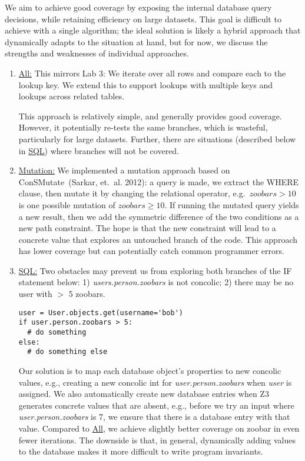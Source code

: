 \documentclass{scrartcl}
\begin{document}
We aim to achieve good coverage
by exposing the internal database query decisions, while retaining
efficiency on large datasets. This goal is difficult to achieve with a single
algorithm; the ideal solution is likely a hybrid approach that dynamically adapts to
the situation at hand, but for now, we discuss the strengths and weaknesses of
individual approaches.

\begin{enumerate}
\item \underline{All:}
  This mirrors Lab 3: We iterate over all rows and compare each to the lookup
  key.
  We extend this 
  to support lookups with multiple keys and lookups across
  related tables.

  This approach is relatively simple, and generally provides good
  coverage. However, it potentially re-tests the same branches,
  which is wasteful, particularly for large datasets. Further, there are situations (described
  below in \underline{SQL}) where branches will not be covered.

\item \underline{Mutation:}
  We implemented a mutation approach based on ConSMutate~(Sarkar,
  et.\ al. 2012): a query is made, we extract the WHERE clause,
  then mutate it by changing the relational operator, e.g.\, 
  $\textit{zoobars} > 10$ is one possible mutation of $\textit{zoobars}
  \geq 10$. If running the mutated query yields a new result, then we
  add the symmetric difference of the two conditions as a new path
  constraint. The hope is that the new constraint will lead to a
  concrete value that explores an untouched branch of the code. This
  approach has lower coverage but can potentially catch common
  programmer errors.

\item \underline{SQL:}
  Two obstacles may prevent us from exploring both branches of the IF statement
  below:
  1) \textit{users.person.zoobars} is not
  concolic; 2) there may be no user with $>$ 5 zoobars.
  \begin{verbatim}user = User.objects.get(username='bob')
if user.person.zoobars > 5:
  # do something
else:
  # do something else\end{verbatim}
  Our solution is to map each database object's properties to new concolic
  values, e.g., creating a new concolic int for
  \textit{user.person.zoobars} when \textit{user} is assigned. We also
  automatically create new database entries when Z3 generates
  concrete values that are absent, e.g., before we try an input where
  \textit{user.person.zoobars} is 7, we ensure that there is a
  database entry with that value. Compared to \underline{All}, we
  achieve slightly better coverage on zoobar in even fewer iterations.
  The downside is that, in general, dynamically adding values to the
  database makes it more difficult to write program invariants.
\end{enumerate}
\end{document}
